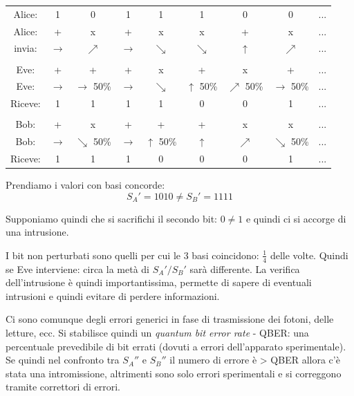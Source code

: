 \begin{table}[ht!]
    \centering
    \begin{tabular}{c|c c c c c c c c}
        Alice: & 1 & 0 & 1 & 1 & 1 & 0 & 0 & ... \\
        Alice: & + & x & + & x & x & + & x & ... \\
        invia: & $\rightarrow$ & $\nearrow$ & $\rightarrow$ & $\searrow$ & $\searrow$ & $\uparrow$ & $\nearrow$ & ... \\
    
        & & & & & & & & \\

        Eve: & + & + & + & x & + & x & + & ... \\
        Eve: & $\rightarrow$ & $\rightarrow$ 50\% & $\rightarrow$ & $\searrow$ & $\uparrow$ 50\% & $\nearrow$ 50\% & $\rightarrow$ 50\% & ... \\
        Riceve: & 1 & 1 & 1 & 1 & 0 & 0 & 1 & ... \\

        & & & & & & & & \\

        Bob: & + & x & + & + & + & x & x & ... \\
        Bob: & $\rightarrow$ & $\searrow$ 50\% & $\rightarrow$ & $\uparrow$ 50\% & $\uparrow$ & $\nearrow$ & $\searrow$ 50\% & ... \\
        Riceve: & 1 & 1 & 1 & 0 & 0 & 0 & 1 & ... \\
    \end{tabular}
\end{table}

Prendiamo i valori con basi concorde:
$$ S_A' = 1010 \neq S_B' = 1111 $$

Supponiamo quindi che si sacrifichi il secondo bit: $0 \neq 1$ e quindi ci si accorge di una intrusione.

I bit non perturbati sono quelli per cui le 3 basi coincidono: $\frac{1}{4}$ delle volte.
Quindi se Eve interviene: circa la metà di $S_A'/S_B'$ sarà differente.
La verifica dell'intrusione è quindi importantissima, permette di sapere di eventuali intrusioni e quindi evitare di perdere informazioni.

Ci sono comunque degli errori generici in fase di trasmissione dei fotoni, delle letture, ecc.
Si stabilisce quindi un \emph{quantum bit error rate} - QBER: una percentuale prevedibile di bit errati (dovuti a errori dell'apparato sperimentale).
Se quindi nel confronto tra $S_A''$ e $S_B''$ il numero di errore è > QBER allora c'è stata una intromissione, altrimenti sono solo errori sperimentali e si correggono tramite correttori di errori.

